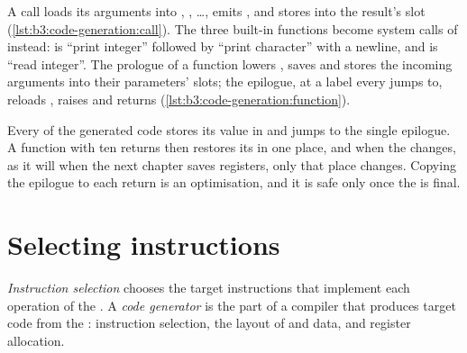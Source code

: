 A call loads its arguments into , , \dots, emits , and stores  into the result's slot (\cref{lst:b3:code-generation:call}). The three built-in functions become system calls of  instead:  is ``print integer'' followed by ``print character'' with a newline, and  is ``read integer''. %
The prologue of a function lowers , saves  and stores the incoming arguments into their parameters' slots; the epilogue, at a label every  jumps to, reloads , raises  and returns (\cref{lst:b3:code-generation:function}).

\label{lst:b3:code-generation:call}

\label{lst:b3:code-generation:function}

\begin{inpractice}
Every  of the generated code stores its value in  and jumps to the single epilogue. A function with ten returns then restores its  in one place, and when the  changes, as it will when the next chapter saves  registers, only that place changes. Copying the epilogue to each return is an optimisation, and it is safe only once the  is final.
\end{inpractice}

\section{Selecting instructions}\label{sec:b3:code-generation:selection}

\begin{definition}\label{def:b3:code-generation:selection}
\emph{Instruction selection} chooses the target instructions that implement each operation of the . A \emph{code generator} is the part of a compiler that produces target code from the : instruction selection, the layout of  and data, and register allocation.
\end{definition}

